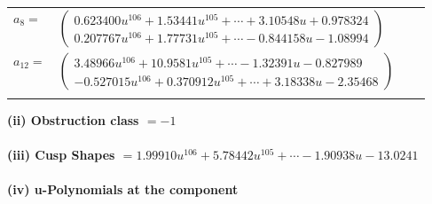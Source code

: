 \documentclass[1p]{elsarticle_modified}
\theoremstyle{definition}
\begin{document}
\begin{tabular}{m{7pt} m{180pt} m{7pt} m{180pt} }
\flushright $a_{8}=$&$\begin{pmatrix}0.623400 u^{106}+1.53441 u^{105}+\cdots+3.10548 u+0.978324\\0.207767 u^{106}+1.77731 u^{105}+\cdots-0.844158 u-1.08994\end{pmatrix}$ \\
\flushright $a_{12}=$&$\begin{pmatrix}3.48966 u^{106}+10.9581 u^{105}+\cdots-1.32391 u-0.827989\\-0.527015 u^{106}+0.370912 u^{105}+\cdots+3.18338 u-2.35468\end{pmatrix}$\\&\end{tabular}
\flushleft \textbf{(ii) Obstruction class $= -1$}\\~\\
\flushleft \textbf{(iii) Cusp Shapes $= 1.99910 u^{106}+5.78442 u^{105}+\cdots-1.90938 u-13.0241$}\\~\\
\newpage\renewcommand{\arraystretch}{1}
\flushleft \textbf{(iv) u-Polynomials at the component}\newline \\
\end{document}
